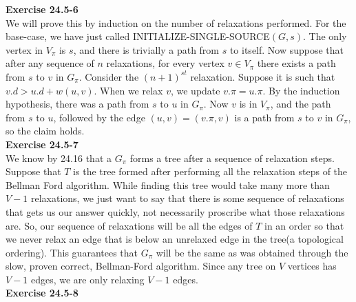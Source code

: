 \documentclass{article}
\begin{document}
\noindent\textbf{Exercise 24.5-6}\\

We will prove this by induction on the number of relaxations performed.  For the base-case, we have just called INITIALIZE-SINGLE-SOURCE$(G,s)$.  The only vertex in $V_\pi$ is $s$, and there is trivially a path from $s$ to itself.  Now suppose that after any sequence of $n$ relaxations, for every vertex $v \in V_\pi$ there exists a path from $s$ to $v$ in $G_\pi$.  Consider the $(n+1)^{st}$ relaxation.  Suppose it is such that $v.d > u.d + w(u,v)$.  When we relax $v$, we update $v.\pi = u.\pi$.  By the induction hypothesis, there was a path from $s$ to $u$ in $G_\pi$.  Now $v$ is in $V_\pi$, and the path from $s$ to $u$, followed by the edge $(u,v) = (v.\pi, v)$ is a path from $s$ to $v$ in $G_\pi$, so the claim holds. \\

\noindent\textbf{Exercise 24.5-7}\\

We know by 24.16 that a $G_\pi$ forms a tree after a sequence of relaxation steps. Suppose that $T$ is the tree formed after performing all the relaxation steps of the Bellman Ford algorithm. While finding this tree would take many more than $V-1$ relaxations, we just want to say that there is some sequence of relaxations that gets us our answer quickly, not necessarily proscribe what those relaxations are. So, our sequence of relaxations will be all the edges of $T$ in an order so that we never relax an edge that is below an unrelaxed edge in the tree(a topological ordering). This guarantees that $G_\pi$ will be the same as was obtained through the slow, proven correct, Bellman-Ford algorithm. Since any tree on $V$ vertices has $V-1$ edges, we are only relaxing $V-1$ edges.\\

\noindent\textbf{Exercise 24.5-8}\\
\end{document}
